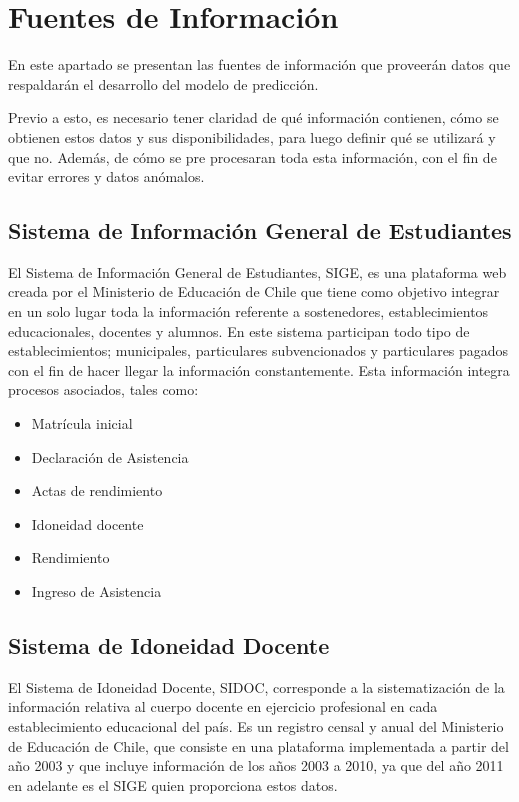 \section{Fuentes de Información}
En este apartado se presentan las fuentes de información que proveerán datos que respaldarán el desarrollo del modelo de predicción. 

Previo a esto, es necesario tener claridad de qué información contienen, cómo se obtienen estos datos y sus disponibilidades, para luego definir qué se utilizará y que no. Además, de cómo se pre procesaran toda esta información, con el fin de evitar errores y datos anómalos. 

\subsection{Sistema de Información General de Estudiantes}
El Sistema de Información General de Estudiantes, SIGE, es una plataforma web creada por el Ministerio de Educación de Chile que tiene como objetivo integrar en un solo lugar toda la información referente a sostenedores, establecimientos educacionales, docentes y alumnos. 
En este sistema participan todo tipo de establecimientos; municipales, particulares subvencionados y particulares pagados con el fin de hacer llegar la información constantemente. 
Esta información integra procesos asociados, tales como:
\begin{itemize}
\item Matrícula inicial
\item Declaración de Asistencia
\item Actas de rendimiento 
\item Idoneidad docente
\item Rendimiento 
\item Ingreso de Asistencia
\end{itemize}

\subsection{Sistema de Idoneidad Docente}
El Sistema de Idoneidad Docente, SIDOC, corresponde a la sistematización de la información relativa al cuerpo docente en ejercicio profesional en cada establecimiento educacional del país. Es un registro censal y anual del Ministerio de Educación de Chile, que consiste en una plataforma implementada a partir del año 2003 y que incluye información de los años 2003 a 2010, ya que del año 2011 en adelante es el SIGE quien proporciona estos datos.

